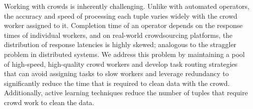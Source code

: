 

Working with crowds is inherently challenging.
Unlike with automated operators, the accuracy and speed of processing each tuple varies widely with the crowd worker assigned to it.
Completion time of an operator depends on the response times of individual workers, and on real-world crowdsourcing 
platforms, the distribution of response latencies is highly skewed; analogous to the straggler problem in distributed systems.
We address this problem by maintaining a pool of high-speed, high-quality crowd workers and develop task routing strategies 
that can avoid assigning tasks to slow workers and leverage redundancy to significantly reduce the time that is required to clean 
data with the crowd. 
Additionally, active learning techniques reduce the number of tuples that require crowd work to clean the data.

